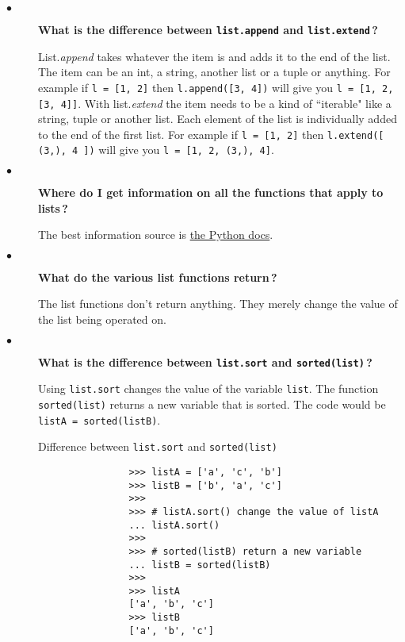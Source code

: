 \documentclass{article}
\newcommand{\inlinecode}[1]{\texttt{#1}}
\newcommand{\link}[2]{\textcolor{blue}{\href{#2}{#1}}}
\newcommand{\question}[1]{\item[$\bullet$] 
	\begin{minipage}[t]{\textwidth}
		\bfseries#1
	\end{minipage}
	\hfil
}
\newenvironment{answer}{}{}
\newenvironment{faq}{\begin{description}}{\end{description}}
\begin{document}
\begin{faq}
		\question{What is the difference between \inlinecode{list.append} and \inlinecode{list.extend}\,?}
		\begin{answer}
			List.\textit{append} takes whatever the item is and adds it to the end of the list. The item can be an int, a string, another list or a tuple or anything. For example if \inlinecode{l = [1, 2]} then \inlinecode{l.append([3, 4])} will give you \inlinecode{l = [1, 2, [3, 4]]}. With list.\textit{extend} the item needs to be a kind of ``iterable" like a string, tuple or another list. Each element of the list is individually added to the end of the first list. For example if \inlinecode{l = [1, 2]} then \inlinecode{l.extend([ (3,), 4 ])} will give you \inlinecode{l = [1, 2, (3,), 4]}.
		\end{answer}
		
		\question{Where do I get information on all the functions that apply to lists\,?}
		\begin{answer}
			The best information source is \link{the Python docs}{https://docs.python.org/3/tutorial/datastructures.html}.
		\end{answer}
		
		\question{What do the various list functions return\,?}
		\begin{answer}
			The list functions don't return anything. They merely change the value of the list being operated on.
		\end{answer}
		
		\question{What is the difference between \inlinecode{list.sort} and \inlinecode{sorted(list)}\,?}
		\begin{answer}
			Using \inlinecode{list.sort} changes the value of the variable \inlinecode{list}. The function \inlinecode{sorted(list)} returns a new variable that is sorted. The code would be \inlinecode{listA = sorted(listB)}. \newpage
			
			\begin{table}[htb]
				\caption{Difference between \texttt{list.sort} and \texttt{sorted(list)}}
				\begin{verbatim}
				>>> listA = ['a', 'c', 'b']
				>>> listB = ['b', 'a', 'c']
				>>>
				>>> # listA.sort() change the value of listA
				... listA.sort()
				>>>
				>>> # sorted(listB) return a new variable
				... listB = sorted(listB)
				>>>
				>>> listA
				['a', 'b', 'c']
				>>> listB
				['a', 'b', 'c']
				\end{verbatim}
			\end{table}
			

\end{answer}
\end{faq}
\end{document}
